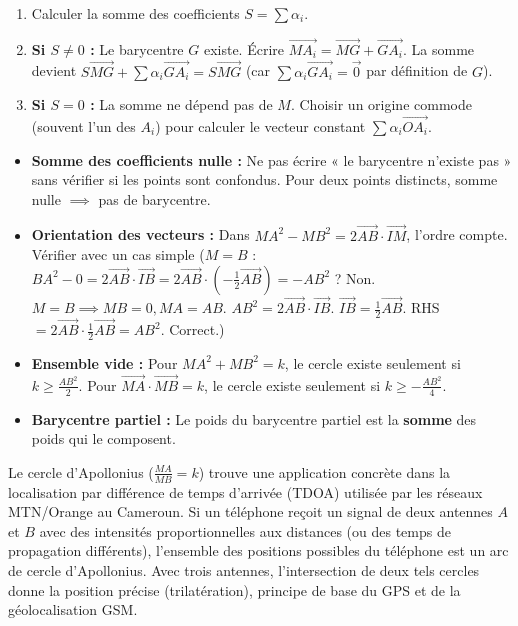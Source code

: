 \documentclass[11pt]{article}
\begin{document}
\begin{methode}
\begin{enumerate}
\item Calculer la somme des coefficients $S = \sum \alpha_i$.
\item \textbf{Si $S \neq 0$ :} Le barycentre $G$ existe. Écrire $\overrightarrow{MA_i} = \overrightarrow{MG} + \overrightarrow{GA_i}$. La somme devient $S\overrightarrow{MG} + \sum \alpha_i \overrightarrow{GA_i} = S\overrightarrow{MG}$ (car $\sum \alpha_i \overrightarrow{GA_i} = \vec{0}$ par définition de $G$).
\item \textbf{Si $S = 0$ :} La somme ne dépend pas de $M$. Choisir un origine commode (souvent l'un des $A_i$) pour calculer le vecteur constant $\sum \alpha_i \overrightarrow{OA_i}$.
\end{enumerate}
\end{methode}

\begin{attention}
\begin{itemize}
\item \textbf{Somme des coefficients nulle :} Ne pas écrire « le barycentre n'existe pas » sans vérifier si les points sont confondus. Pour deux points distincts, somme nulle $\implies$ pas de barycentre.
\item \textbf{Orientation des vecteurs :} Dans $MA^2 - MB^2 = 2\overrightarrow{AB}\cdot\overrightarrow{IM}$, l'ordre compte. Vérifier avec un cas simple ($M=B$ : $BA^2 - 0 = 2\overrightarrow{AB}\cdot\overrightarrow{IB} = 2\overrightarrow{AB}\cdot(-\frac{1}{2}\overrightarrow{AB}) = -AB^2$ ? Non. $M=B \implies MB=0, MA=AB$. $AB^2 = 2\overrightarrow{AB}\cdot\overrightarrow{IB}$. $\overrightarrow{IB} = \frac{1}{2}\overrightarrow{AB}$. RHS $= 2\overrightarrow{AB}\cdot\frac{1}{2}\overrightarrow{AB} = AB^2$. Correct.)
\item \textbf{Ensemble vide :} Pour $MA^2+MB^2=k$, le cercle existe seulement si $k \ge \frac{AB^2}{2}$. Pour $\overrightarrow{MA}\cdot\overrightarrow{MB}=k$, le cercle existe seulement si $k \ge -\frac{AB^2}{4}$.
\item \textbf{Barycentre partiel :} Le poids du barycentre partiel est la \textbf{somme} des poids qui le composent.
\end{itemize}
\end{attention}

\begin{savaistu}
Le cercle d'Apollonius ($\frac{MA}{MB}=k$) trouve une application concrète dans la localisation par différence de temps d'arrivée (TDOA) utilisée par les réseaux MTN/Orange au Cameroun. Si un téléphone reçoit un signal de deux antennes $A$ et $B$ avec des intensités proportionnelles aux distances (ou des temps de propagation différents), l'ensemble des positions possibles du téléphone est un arc de cercle d'Apollonius. Avec trois antennes, l'intersection de deux tels cercles donne la position précise (trilatération), principe de base du GPS et de la géolocalisation GSM.
\end{savaistu}
\end{document}
